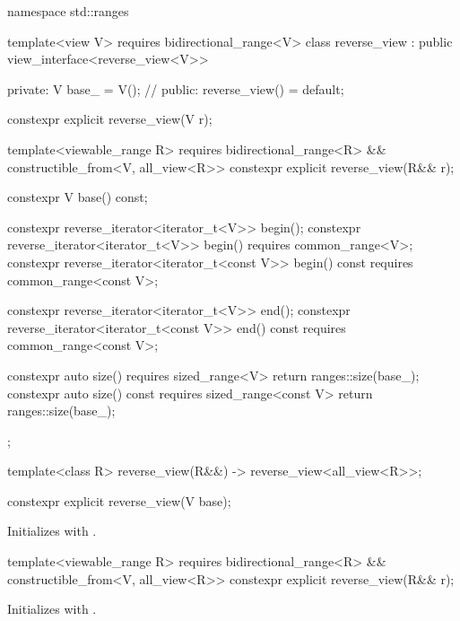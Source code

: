 %
\begin{codeblock}
namespace std::ranges {
  template<view V>
    requires bidirectional_range<V>
  class reverse_view : public view_interface<reverse_view<V>> {
  private:
    V base_ = V();  // \expos
  public:
    reverse_view() = default;

    constexpr explicit reverse_view(V r);

    template<viewable_range R>
      requires bidirectional_range<R> && constructible_from<V, all_view<R>>
    constexpr explicit reverse_view(R&& r);

    constexpr V base() const;

    constexpr reverse_iterator<iterator_t<V>> begin();
    constexpr reverse_iterator<iterator_t<V>> begin() requires common_range<V>;
    constexpr reverse_iterator<iterator_t<const V>> begin() const
      requires common_range<const V>;

    constexpr reverse_iterator<iterator_t<V>> end();
    constexpr reverse_iterator<iterator_t<const V>> end() const
      requires common_range<const V>;

    constexpr auto size() requires sized_range<V> {
      return ranges::size(base_);
    }
    constexpr auto size() const requires sized_range<const V> {
      return ranges::size(base_);
    }
  };

  template<class R>
    reverse_view(R&&) -> reverse_view<all_view<R>>;
}
\end{codeblock}

%
\begin{itemdecl}
constexpr explicit reverse_view(V base);
\end{itemdecl}

\begin{itemdescr}
\pnum
\effects
Initializes  with .
\end{itemdescr}

%
\begin{itemdecl}
template<viewable_range R>
  requires bidirectional_range<R> && constructible_from<V, all_view<R>>
constexpr explicit reverse_view(R&& r);
\end{itemdecl}

\begin{itemdescr}
\pnum
\effects
Initializes  with .
\end{itemdescr}

